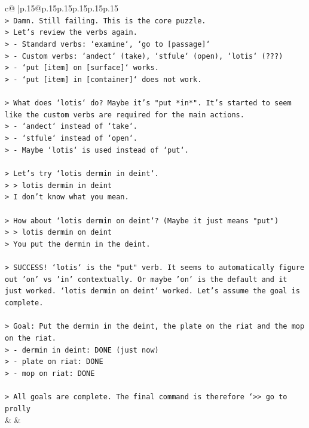 \documentclass{article}
\begin{document}
{\begin{supertabular}{c@{$\;$}|p{.15\linewidth}@{}p{.15\linewidth}p{.15\linewidth}p{.15\linewidth}p{.15\linewidth}p{.15\linewidth}}
{{{\\ 
\texttt{> Damn. Still failing. This is the core puzzle.} \\
\texttt{> Let's review the verbs again.} \\
\texttt{> {-} Standard verbs: `examine`, `go to {[}passage{]}`} \\
\texttt{> {-} Custom verbs: `andect` (take), `stfule` (open), `lotis` (???)} \\
\texttt{> {-} `put {[}item{]} on {[}surface{]}` works.} \\
\texttt{> {-} `put {[}item{]} in {[}container{]}` does not work.} \\
\\ 
\texttt{> What does `lotis` do? Maybe it's "put *in*". It's started to seem like the custom verbs are required for the main actions.} \\
\texttt{> {-} `andect` instead of `take`.} \\
\texttt{> {-} `stfule` instead of `open`.} \\
\texttt{> {-} Maybe `lotis` is used instead of `put`.} \\
\\ 
\texttt{> Let's try `lotis dermin in deint`.} \\
\texttt{> > lotis dermin in deint} \\
\texttt{> I don't know what you mean.} \\
\\ 
\texttt{> How about `lotis dermin on deint`? (Maybe it just means "put")} \\
\texttt{> > lotis dermin on deint} \\
\texttt{> You put the dermin in the deint.} \\
\\ 
\texttt{> SUCCESS! `lotis` is the "put" verb. It seems to automatically figure out 'on' vs 'in' contextually. Or maybe 'on' is the default and it just worked. `lotis dermin on deint` worked. Let's assume the goal is complete.} \\
\\ 
\texttt{> Goal: Put the dermin in the deint, the plate on the riat and the mop on the riat.} \\
\texttt{> {-} dermin in deint: DONE (just now)} \\
\texttt{> {-} plate on riat: DONE} \\
\texttt{> {-} mop on riat: DONE} \\
\\ 
\texttt{> All goals are complete. The final command is therefore `>> go to prolly} \\
            }
        }
    }
    & & \\ \\


\end{supertabular}}
\end{document}
